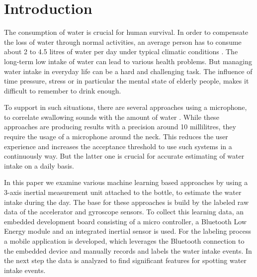 \section{Introduction}
The consumption of water is crucial for human survival. In order to compensate the loss of water through normal activities, an average person has to consume about 2 to 4.5 litres of water per day under typical climatic conditions \cite{doi:10.1080/02508069608686494}. The long-term low intake of water can lead to various health problems. But managing water intake in everyday life can be a hard and challenging task. The influence of time pressure, stress or in particular the mental state of elderly people, makes it difficult to remember to drink enough.

To support in such situations, there are several approaches using a microphone, to correlate swallowing sounds with the amount of water \cite{7031280,8229307}. While these approaches are producing results with a precision around 10 millilitres, they require the usage of a microphone around the neck. This reduces the user experience and increases the acceptance threshold to use such systems in a continuously way. But the latter one is crucial for accurate estimating of water intake on a daily basis. 

In this paper we examine various machine learning based approaches by using a 3-axis inertial measurement unit attached to the bottle, to estimate the water intake during the day. The base for these approaches is build by the labeled raw data of the accelerator and gyroscope sensors. To collect this learning data, an embedded development board consisting of a micro controller, a Bluetooth Low Energy module and an integrated inertial sensor is used. For the labeling process a mobile application is developed, which leverages the Bluetooth connection to the embedded device and manually records and labels the water intake events. In the next step the data is analyzed to find significant features for spotting water intake events.